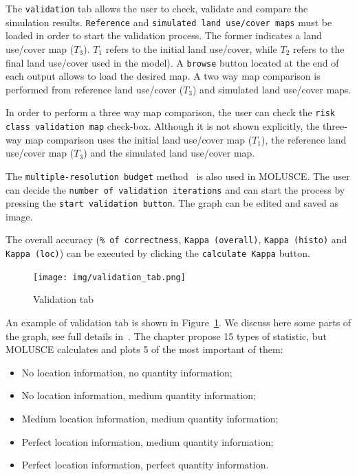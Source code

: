 \documentclass{report}
\begin{document}
The \verb+validation+ tab allows the user to check, validate and compare the simulation results. 
\verb+Reference+ and \verb+simulated land use/cover maps+ must be loaded in order 
to start the validation process. The
former indicates a land use/cover map ($T_3$). $T_1$ refers to the initial land use/cover, while $T_2$ refers to
the final land use/cover used in the model). A \verb+browse+ button located at the end of each output
allows to load the desired map. A two way map comparison is performed from reference land
use/cover ($T_3$) and simulated land use/cover maps.

In order to perform a three way map comparison, the user can check the \verb+risk class validation map+
check-box. Although it is not shown explicitly, the three-way map comparison uses the initial land
use/cover map ($T_1$), the reference land use/cover map ($T_3$) and the simulated land use/cover map.

The \verb+multiple-resolution budget+ method~\cite[Chapter~17]{pontius2004maps_aggreament} is also used in MOLUSCE. The user can decide the 
\verb+number of validation iterations+ and can start the process by pressing the \verb+start validation button+.
The graph can be edited and saved as image.

The overall accuracy (\verb+% of correctness+, \verb+Kappa (overall)+, \verb+Kappa (histo)+ and \verb+Kappa (loc)+) can be
executed by clicking the \verb+calculate Kappa+ button.

\begin{figure}[h!]
\centering
\texttt{[image: img/validation\_tab.png]}
\caption{Validation tab}
\label{fig:validation_tab}
\end{figure}

An example of validation tab is shown in Figure~\ref{fig:validation_tab}.
We discuss here some parts of the graph, see full details in~\cite[Chapter~17]{pontius2004maps_aggreament}.
The chapter propose 15 types of statistic, but MOLUSCE calculates and plots 5 of the most important of them:
\begin{itemize}
  \item No location information, no quantity information;
  \item No location information, medium quantity information;
  \item Medium location information, medium quantity information;
  \item Perfect location information, medium quantity information;
  \item Perfect location information, perfect quantity information.
\end{itemize}
\end{document}
